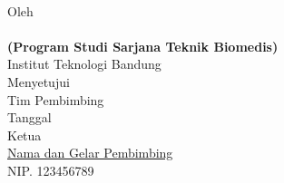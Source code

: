 \clearpage
\pagestyle{empty}

\begin{center}

    \large{\bfseries \MakeUppercase{\thetitle}}
    \\[2\baselineskip]
	
	\renewcommand{\baselinestretch}{1}
    \normalsize{Oleh\\
    \textbf{\theauthor}\\
    \textbf{(Program Studi Sarjana Teknik Biomedis)}
    \\[\baselineskip]
    Institut Teknologi Bandung}
    \\[3\baselineskip]


    \normalsize{Menyetujui\\
    Tim Pembimbing
    \\[\baselineskip]
    
    Tanggal \thedate\\[3\baselineskip]
    Ketua\\[4\baselineskip]
    \underline{Nama dan Gelar Pembimbing}\\
    NIP. 123456789}

\end{center}
\clearpage
